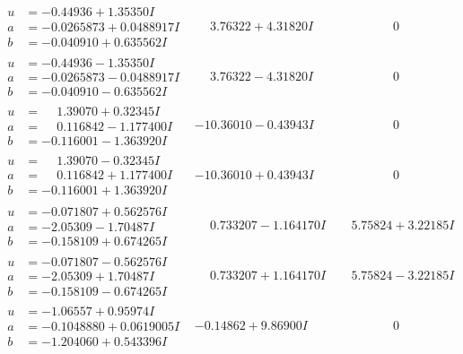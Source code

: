 \documentclass[1p]{elsarticle_modified}
\theoremstyle{definition}
\begin{document}
$$\begin{array}{c|c|c}
\begin{aligned}
u &= -0.44936 + 1.35350 I \\
a &= -0.0265873 + 0.0488917 I \\
b &= -0.040910 + 0.635562 I\end{aligned}
 & \phantom{-}3.76322 + 4.31820 I & \phantom{-0.000000 } 0 \\ \hline\begin{aligned}
u &= -0.44936 - 1.35350 I \\
a &= -0.0265873 - 0.0488917 I \\
b &= -0.040910 - 0.635562 I\end{aligned}
 & \phantom{-}3.76322 - 4.31820 I & \phantom{-0.000000 } 0 \\ \hline\begin{aligned}
u &= \phantom{-}1.39070 + 0.32345 I \\
a &= \phantom{-}0.116842 - 1.177400 I \\
b &= -0.116001 - 1.363920 I\end{aligned}
 & -10.36010 - 0.43943 I & \phantom{-0.000000 } 0 \\ \hline\begin{aligned}
u &= \phantom{-}1.39070 - 0.32345 I \\
a &= \phantom{-}0.116842 + 1.177400 I \\
b &= -0.116001 + 1.363920 I\end{aligned}
 & -10.36010 + 0.43943 I & \phantom{-0.000000 } 0 \\ \hline\begin{aligned}
u &= -0.071807 + 0.562576 I \\
a &= -2.05309 - 1.70487 I \\
b &= -0.158109 + 0.674265 I\end{aligned}
 & \phantom{-}0.733207 - 1.164170 I & \phantom{-}5.75824 + 3.22185 I \\ \hline\begin{aligned}
u &= -0.071807 - 0.562576 I \\
a &= -2.05309 + 1.70487 I \\
b &= -0.158109 - 0.674265 I\end{aligned}
 & \phantom{-}0.733207 + 1.164170 I & \phantom{-}5.75824 - 3.22185 I \\ \hline\begin{aligned}
u &= -1.06557 + 0.95974 I \\
a &= -0.1048880 + 0.0619005 I \\
b &= -1.204060 + 0.543396 I\end{aligned}
 & -0.14862 + 9.86900 I & \phantom{-0.000000 } 0 \\ \hline\begin{aligned}

\end{aligned}
\end{array}$$
\end{document}
